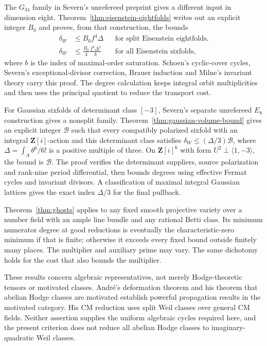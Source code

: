 \documentclass[11pt]{article}
\theoremstyle{definition}
\theoremstyle{remark}
\newcommand{\Z}{\mathbf Z}
\begin{document}
The $G_{34}$ family in Severn's unrefereed preprint gives a different input in dimension eight. Theorem~\ref{thm:eisenstein-eightfolds} writes out an explicit integer $B_0$ and proves, from that construction, the bounds
\[
 \begin{aligned}
 \delta_W&\le B_0f^4\Delta
 &&\text{for split Eisenstein eightfolds},\\
 \delta_W&\le\frac{B_0}{4}\frac{f^9\Delta^2}{b}
 &&\text{for all Eisenstein sixfolds},
 \end{aligned}
\]
where $b$ is the index of maximal-order saturation. Schoen's cyclic-cover cycles, Severn's exceptional-divisor correction, Brauer induction and Milne's invariant theory carry this proof. The degree calculation keeps integral orbit multiplicities and then uses the principal quotient to reduce the transport cost.


For Gaussian sixfolds of determinant class $[-3]$, Severn's separate
unrefereed $E_8$ construction \cite{SevernGaussian} gives a nonsplit
family. Theorem~\ref{thm:gaussian-volume-bound} gives an explicit
integer $\mathcal B$ such that every compatibly polarized sixfold with
an integral $\Z[i]$-action and this determinant class satisfies
$\delta_W\le(\Delta/3)\mathcal B$, where
$\Delta=\int_A\theta^6/6!$ is a positive multiple of three.
On $\Z[i]^6$ with form $U^2\perp\langle1,-3\rangle$, the bound is
$\mathcal B$.  The proof verifies the determinant suppliers, source
polarization and rank-nine period differential, then bounds degrees
using effective Fermat cycles and invariant divisors.  A classification
of maximal integral Gaussian lattices gives the exact index
$\Delta/3$ for the final pullback.

Theorem~\ref{thm:ghosts} applies to any fixed smooth projective variety over a number field with an ample line bundle and any rational Betti class. Its minimum numerator degree at good reductions is eventually the characteristic-zero minimum if that is finite; otherwise it exceeds every fixed bound outside finitely many places. The multiplier and auxiliary prime may vary. The same dichotomy holds for the cost that also bounds the multiplier.

These results concern algebraic representatives, not merely Hodge-theoretic tensors or motivated classes. Andr\'e's deformation theorem and his theorem that abelian Hodge classes are motivated \cite[Theorems~0.5 and 0.6.2, pp.~8--9]{Andre96} establish powerful propagation results in the motivated category. His CM reduction \cite[Lemma~6.3.2, p.~32]{Andre96} uses split Weil classes over general CM fields. Neither assertion supplies the uniform algebraic cycles required here, and the present criterion does not reduce all abelian Hodge classes to imaginary-quadratic Weil classes.
\end{document}
